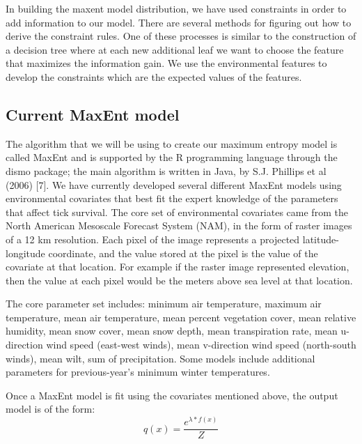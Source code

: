 \noindent In building the maxent model distribution, we have used constraints in order to add information to our model. There are several methods for figuring out how to derive the constraint rules. One of these processes is similar to the construction of a decision tree where at each new additional leaf we want to choose the feature that maximizes the information gain. We use the environmental features to develop the constraints which are the expected values of the features.\newline

\subsection{Current MaxEnt model}

\noindent The algorithm that we will be using to create our maximum entropy model is called MaxEnt and is supported by the R programming language through the dismo package; the main algorithm is written in Java, by S.J. Phillips et al (2006) [7]. We have currently developed several different MaxEnt models using environmental covariates that best fit the expert knowledge of the parameters that affect tick survival. The core set of environmental covariates came from the North American Mesoscale Forecast System (NAM), in the form of raster images of a 12 km resolution. Each pixel of the image represents a projected latitude-longitude coordinate, and the value stored at the pixel is the value of the covariate at that location. For example if the raster image represented elevation, then the value at each pixel would be the meters above sea level at that location. \newline

\noindent The core parameter set includes: minimum air temperature, maximum air temperature, mean air temperature, mean percent vegetation cover, mean relative humidity, mean snow cover, mean snow depth, mean transpiration rate, mean u-direction wind speed (east-west winds), mean v-direction wind speed (north-south winds), mean wilt, sum of precipitation. Some models include additional parameters for previous-year's minimum winter temperatures.  \newline

\noindent Once a MaxEnt model is fit using the covariates mentioned above, the output model is of the form:
\begin{equation}
q(x) = \frac{e^{\lambda* f(x)}}{Z}
\end{equation}

